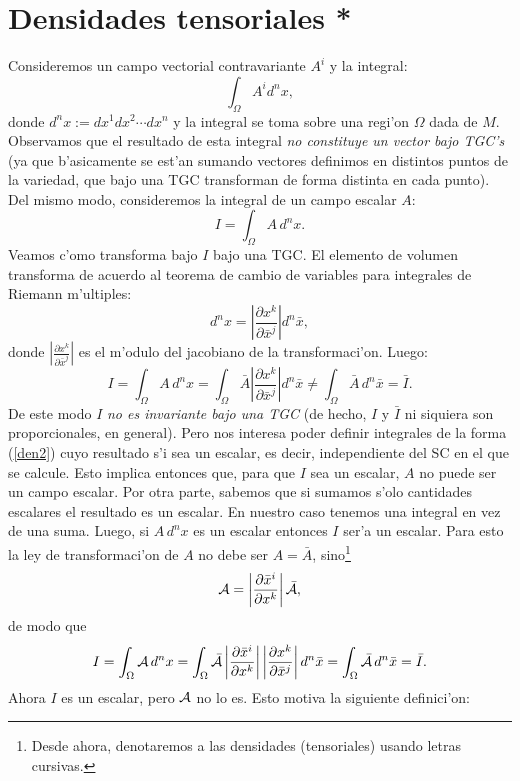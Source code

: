  \section{Densidades tensoriales *}

 Consideremos un campo vectorial contravariante $A^i $ y la integral:
 \begin{equation}
 \int_\Omega A^i d^nx, \label{den1}%
 \end{equation}
 donde $d^nx:=dx^1dx^2\cdots dx^n$ y la integral se toma sobre una
 regi'on $\Omega$ dada de $M$. Observamos que el resultado de esta integral
 \textit{no constituye un vector bajo TGC's} (ya que b'asicamente se est'an
 sumando vectores definimos en distintos puntos de la variedad, que bajo una
 TGC transforman de forma distinta en cada punto). Del mismo modo,
 consideremos la integral de un campo escalar $A$:
 \begin{equation}
 I=\int_\Omega A\,d^nx. \label{den2}%
 \end{equation}
 Veamos c'omo transforma bajo $I$ bajo una TGC. El elemento de volumen
 transforma de acuerdo al teorema de cambio de variables para integrales de
 Riemann m'ultiples:
 \begin{equation}
 d^nx=\left| \frac{\partial x^k }{\partial\bar{x}^j }\right| d^n
 \bar{x} ,
 \end{equation}
 donde $\left| \frac{\partial x^k }{\partial\bar{x}^j }\right|$ es el m'odulo
 del jacobiano de la transformaci'on. Luego:
 \begin{equation}
 I=\int_\Omega A\,d^nx=\int_\Omega\bar{A}\left| \frac{\partial x^k
 }{\partial\bar{x}^j %
 }\right| d^n\bar{x}\neq\int_\Omega\bar{A}\,d^n\bar{x}=\bar{I}.
 \label{den3}%
 \end{equation}
 De este modo $I$ \textit{no es invariante bajo una TGC} (de hecho, $I$ y
 $\bar{I}$ ni siquiera son proporcionales, en general). Pero nos interesa poder
 definir integrales de la forma (\ref{den2}) cuyo resultado s'i sea un
 escalar, es decir, independiente del SC en el que se calcule. Esto implica
 entonces que, para que $I$ sea un escalar, $A$ no puede ser un campo escalar.
 Por otra parte,
 sabemos que si sumamos s'olo cantidades escalares el resultado es un escalar.
 En nuestro caso tenemos una integral en vez de una suma. Luego, si
 $A\,d^nx$ es
 un escalar entonces $I$ ser'a un escalar. Para esto la ley de transformaci'on
 de $A$ no debe ser $A=\bar{A}$, sino\footnote{Desde ahora, denotaremos a las
 densidades (tensoriales) usando letras cursivas.}
 \begin{equation}
 {\cal A}=\left| \frac{\partial\bar{x}^i }{\partial x^k }\right| \bar{{\cal
 A}},
 \label{den4}%
 \end{equation}
 de modo que
 \begin{equation}
 I=\int_\Omega {\cal A}\,d^nx=\int_\Omega\bar{{\cal A}}\left|
 \frac{\partial\bar{x}^i }{\partial x^k %
 }\right| \left| \frac{\partial x^k }{\partial\bar{x}^j }\right|
 d^n\bar{x}
 =\int_\Omega\bar{{\cal A}}\,d^n\bar{x}=\bar{I}. \label{den5}%
 \end{equation}
 Ahora $I$ es un escalar, pero ${\cal A}$ no lo es. Esto motiva la siguiente
 definici'on:

